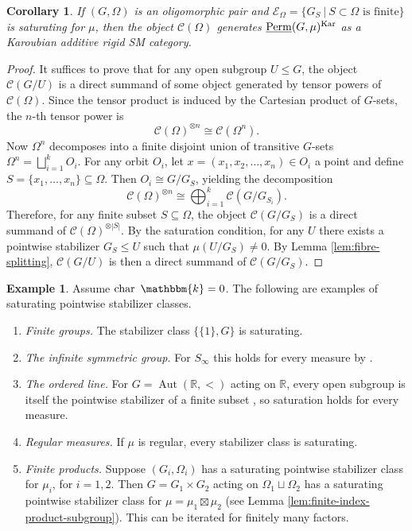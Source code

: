 \documentclass[11pt,a4paper]{amsart}
\theoremstyle{plain}%
\newtheorem{corollary}[lemma]{Corollary}
\theoremstyle{definition}
\newtheorem{example}[lemma]{Example}
\theoremstyle{remark}
\newcommand{\Perm}{\underline{{\rm Perm}}}
\newcommand{\kk}{\mathbbm{k}}
\newcommand{\Kar}{\mathrm{Kar}}
\begin{document}
\begin{corollary} \label{cor:tensor-generator} If $(G,\Omega)$ is an oligomorphic pair and $\mathcal E_\Omega=\{G_S \ | \ S\subset\Omega\text{ is finite}\}$ is saturating for $\mu$, then the object $\mathcal{C}(\Omega)$ generates $\Perm(G, \mu)^{\Kar}$ as a Karoubian additive rigid SM category. 
\end{corollary}

\begin{proof} It suffices to prove that for any open subgroup $U \le G$, the object $\mathcal{C}(G/U)$ is a direct summand of some object generated by tensor powers of $\mathcal{C}(\Omega)$. Since the tensor product is induced by the Cartesian product of $G$-sets, the $n$-th tensor power is\[\mathcal{C}(\Omega)^{\otimes n} \cong \mathcal{C}(\Omega^n).\] Now $\Omega^n$ decomposes into a finite disjoint union of transitive $G$-sets $\Omega^n = \bigsqcup_{i=1}^k O_i$. For any orbit $O_i$, let $x = (x_1, x_2, \dots, x_n) \in O_i$ a point and define $S = \{x_1, \dots, x_n\} \subseteq \Omega$. Then $O_i \cong G/G_S$, yielding the decomposition \[ \mathcal{C}(\Omega)^{\otimes n} \cong \bigoplus_{i=1}^k \mathcal{C}(G/G_{S_i}).\] Therefore, for any finite subset $S \subseteq \Omega$, the object $\mathcal{C}(G/G_S)$ is a direct summand of $\mathcal{C}(\Omega)^{\otimes |S|}$. By the saturation condition, for any $U$ there exists a pointwise stabilizer $G_S \le U$ such that {$\mu(U/G_S)\neq 0$}. By Lemma \ref{lem:fibre-splitting}, $\mathcal{C}(G/U)$ is then a direct summand of $\mathcal{C}(G/G_S)$.
\end{proof}

\begin{example}\label{ex:saturating}
Assume $\operatorname{char}~\kk=0$. The following are examples of saturating
pointwise stabilizer classes.
\begin{enumerate}
\renewcommand{\labelenumi}{\textnormal{(\roman{enumi})}}
\item \emph{Finite groups.}
The stabilizer class {$\{\{1\},G\}$} is saturating.

\item \emph{The infinite symmetric group.}
For $S_\infty$ this holds for every measure by \cite[Proposition~14.1]{HS-oligomorphic}.

\item \emph{The ordered line.}
For $G=\operatorname{Aut}(\mathbb R,<)$ acting on $\mathbb R$, every open subgroup is itself
the pointwise stabilizer of a finite subset
\cite[Proposition~16.1]{HS-oligomorphic}, so saturation holds for every measure.

\item \emph{Regular measures.}
If $\mu$ is regular, every stabilizer class is saturating.

\item \emph{Finite products.}
Suppose $(G_i,\Omega_i)$ has a saturating pointwise stabilizer class for
$\mu_i$, for $i=1,2$. Then $G=G_1\times G_2$ acting on
$\Omega_1\sqcup\Omega_2$ has a saturating pointwise stabilizer class for
$\mu=\mu_1\boxtimes\mu_2$ (see Lemma \ref{lem:finite-index-product-subgroup}). This can be iterated for finitely many factors.
\end{enumerate}
\end{example}
\end{document}

